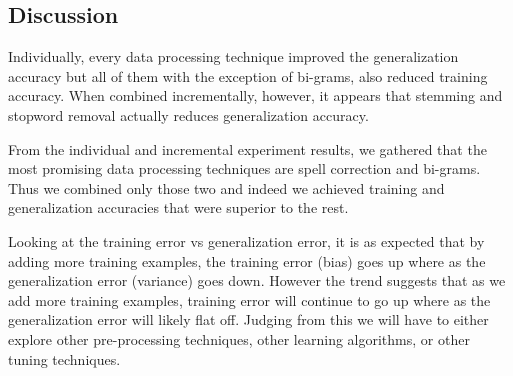 \subsection*{Discussion}

Individually, every data processing technique improved the generalization
accuracy but all of them with the exception of bi-grams, also reduced
training accuracy. When combined incrementally, however, it appears
that stemming and stopword removal actually reduces generalization
accuracy.

From the individual and incremental experiment results, we gathered
that the most promising data processing techniques are spell correction
and bi-grams. Thus we combined only those two and indeed we achieved
training and generalization accuracies that were superior to the rest.

Looking at the training error vs generalization error, it is as expected
that by adding more training examples, the training error (bias) goes
up where as the generalization error (variance) goes down. However
the trend suggests that as we add more training examples, training
error will continue to go up where as the generalization error will
likely flat off. Judging from this we will have to either explore
other pre-processing techniques, other learning algorithms, or other
tuning techniques.
